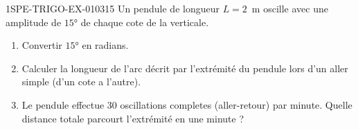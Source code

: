 \begin{exercice}{1SPE-TRIGO-EX-010}{3}{15}
Un pendule de longueur $L = 2$~m oscille avec une amplitude de $15°$ de chaque cote de la verticale.
\begin{enumerate}
  \item Convertir $15°$ en radians.
  \item Calculer la longueur de l'arc décrit par l'extrémité du pendule lors d'un aller simple (d'un cote a l'autre).
  \item Le pendule effectue $30$ oscillations completes (aller-retour) par minute. Quelle distance totale parcourt l'extrémité en une minute ?
\end{enumerate}
\end{exercice}
